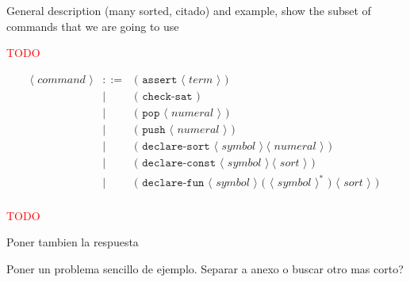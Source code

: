General description (many sorted, citado) and example, show the subset of commands that we are going to use

\textcolor{red}{TODO}

\[
\begin{array}{rcll}
\langle\textit{ command }\rangle & ::= & \texttt{( assert } \langle\textit{ term }\rangle\texttt{ ) }\\
& | & \texttt{( check-sat )}\\
& | & \texttt{( pop } \langle\textit{ numeral }\rangle \texttt{ ) }\\
& | & \texttt{( push } \langle\textit{ numeral }\rangle \texttt{ ) }\\
& | & \texttt{( declare-sort } \langle\textit{ symbol }\rangle~\langle\textit{ numeral }\rangle\texttt{ ) }\\
& | & \texttt{( declare-const } \langle\textit{ symbol }\rangle~\langle\textit{ sort }\rangle\texttt{ ) }\\
& | & \texttt{( declare-fun } \langle\textit{ symbol }\rangle \texttt{ ( }\langle\textit{ symbol }\rangle^* \texttt{ ) }\langle\textit{ sort }\rangle\texttt{ ) }\\
\end{array}
\]

\textcolor{red}{TODO}

Poner tambien la respuesta

Poner un problema sencillo de ejemplo. Separar a anexo o buscar otro mas corto?

